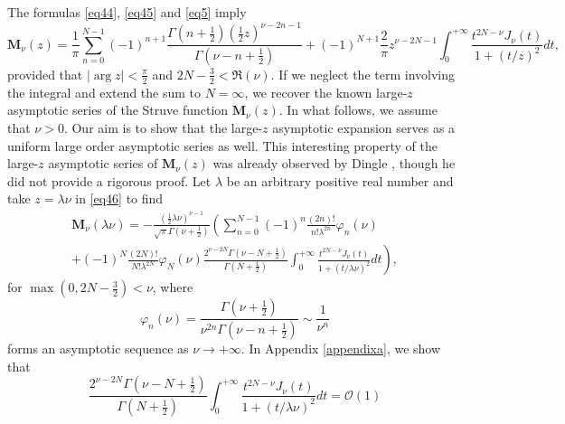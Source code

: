 \documentclass[a4paper,twoside,10pt]{amsart}
\numberwithin{equation}{section}
\begin{document}
The formulas \eqref{eq44}, \eqref{eq45} and \eqref{eq5} imply
\begin{equation}\label{eq46}
\mathbf{M}_\nu  \left( z \right) = \frac{1}{\pi }\sum\limits_{n = 0}^{N - 1} {\left( { - 1} \right)^{n + 1} \frac{{\Gamma \left( {n + \frac{1}{2}} \right)\left( {\frac{1}{2}z} \right)^{\nu  - 2n - 1} }}{{\Gamma \left( {\nu  - n + \frac{1}{2}} \right)}}}  + \left( { - 1} \right)^{N + 1} \frac{2}{\pi }z^{\nu  - 2N - 1} \int_0^{ + \infty } {\frac{{t^{2N - \nu } J_\nu  \left( t \right)}}{{1 + \left( {t/z} \right)^2 }}dt} ,
\end{equation}
provided that $\left|\arg z\right|<\frac{\pi}{2}$ and $2N - \frac{3}{2} < \Re \left( \nu  \right)$. If we neglect the term involving the integral and extend the sum to $N=\infty$, we recover the known large-$z$ asymptotic series of the Struve function $\mathbf{M}_\nu  \left( z \right)$. In what follows, we assume that $\nu>0$. Our aim is to show that the large-$z$ asymptotic expansion serves as a uniform large order asymptotic series as well. This interesting property of the large-$z$ asymptotic series of $\mathbf{M}_\nu  \left( z \right)$ was already observed by Dingle \cite[pp. 389--391]{Dingle}, though he did not provide a rigorous proof. Let $\lambda$ be an arbitrary positive real number and take $z=\lambda \nu$ in \eqref{eq46} to find
\begin{multline*}
\mathbf{M}_\nu  \left( {\lambda \nu } \right) =  - \frac{{\left( {\frac{1}{2}\lambda \nu } \right)^{\nu  - 1} }}{{\sqrt \pi  \Gamma \left( {\nu  + \frac{1}{2}} \right)}}\left( {\sum\limits_{n = 0}^{N - 1} {\left( { - 1} \right)^n \frac{\left(2n\right)!}{n!  \lambda ^{2n} }\varphi _n \left( \nu  \right)} }\right. \\ \left.{+ \left( { - 1} \right)^N \frac{{\left( {2N} \right)!}}{{N!\lambda ^{2N} }}\varphi _N \left( \nu  \right)\frac{{2^{\nu  - 2N} \Gamma \left( {\nu  - N + \frac{1}{2}} \right)}}{{\Gamma \left( {N + \frac{1}{2}} \right)}}\int_0^{ + \infty } {\frac{{t^{2N - \nu } J_\nu  \left( t \right)}}{{1 + \left( {t/\lambda \nu } \right)^2 }}dt} } \right),
\end{multline*}
for $\max\left(0,2N - \frac{3}{2}\right) < \nu$, where
\[
\varphi _n \left( \nu  \right) = \frac{{\Gamma \left( {\nu  + \frac{1}{2}} \right)}}{{\nu ^{2n} \Gamma \left( {\nu  - n + \frac{1}{2}} \right)}} \sim \frac{1}{\nu^n}
\]
forms an asymptotic sequence as $\nu \to +\infty$. In Appendix \ref{appendixa}, we show that
\begin{equation}\label{eq43}
\frac{{2^{\nu  - 2N} \Gamma \left( {\nu  - N + \frac{1}{2}} \right)}}{{\Gamma \left( {N + \frac{1}{2}} \right)}}\int_0^{ + \infty } {\frac{{t^{2N - \nu } J_\nu  \left( t \right)}}{{1 + \left( {t/\lambda \nu } \right)^2 }}dt}  = \mathcal{O}\left( 1 \right)
\end{equation}
\end{document}
